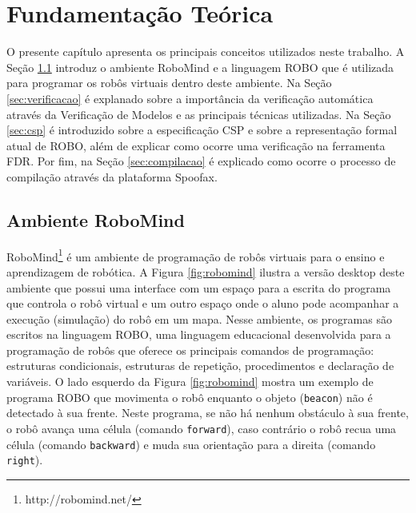 \chapter{Fundamentação Teórica}
\label{chap:cap2}

O presente capítulo apresenta os principais conceitos utilizados neste trabalho. A Seção \ref{sec:ambiente} introduz o ambiente RoboMind e a linguagem ROBO que é utilizada para programar os robôs virtuais dentro deste ambiente. Na Seção \ref{sec:verificacao} é explanado sobre a importância da verificação automática através da Verificação de Modelos e as principais técnicas utilizadas. Na Seção \ref{sec:csp} é introduzido sobre a especificação CSP e sobre a representação formal atual de ROBO, além de explicar como ocorre uma verificação na ferramenta FDR. Por fim, na Seção \ref{sec:compilacao} é explicado como ocorre o processo de compilação através da plataforma Spoofax.

\section{Ambiente RoboMind}
\label{sec:ambiente}


RoboMind\footnote[3]{http://robomind.net/} é um ambiente de programação de robôs virtuais para o ensino e aprendizagem de robótica. A Figura \ref{fig:robomind} ilustra a versão desktop deste ambiente que possui uma interface com um espaço para a escrita do programa que controla o robô virtual e um outro espaço onde o aluno pode acompanhar a execução (simulação) do robô em um mapa. Nesse ambiente, os programas são escritos na linguagem ROBO, uma linguagem educacional desenvolvida para a programação de robôs que oferece os principais comandos de programação: estruturas condicionais, estruturas de repetição, procedimentos e declaração de variáveis. O lado esquerdo da Figura \ref{fig:robomind} mostra um exemplo de programa ROBO que movimenta o robô enquanto o objeto (\texttt{beacon}) não é detectado à sua frente. Neste programa, se não há nenhum obstáculo à sua frente, o robô avança uma célula (comando \texttt{forward}), caso contrário o robô recua uma célula (comando \texttt{backward}) e muda sua orientação para a direita (comando \texttt{right}).


